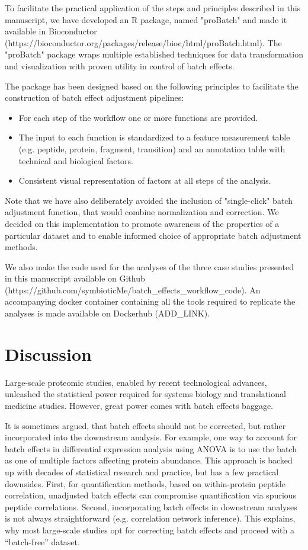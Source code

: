 \documentclass[num-refs]{wiley-article}
\begin{document}
To facilitate the practical application of the steps and principles described in this manuscript, we have developed an R package, named "proBatch" and made it available in Bioconductor (https://bioconductor.org/packages/release/bioc/html/proBatch.html). The "proBatch" package wraps multiple established techniques for data transformation and visualization with proven utility in control of batch effects. 

The package has been designed based on the following principles to facilitate the construction of batch effect adjustment pipelines:

\begin{itemize}
    \item For each step of the workflow one or more functions are provided.
    \item The input to each function is standardized to a feature measurement table (e.g. peptide, protein, fragment, transition) and an annotation table with technical and biological factors.
    \item Consistent visual representation of factors at all steps of the analysis.
\end{itemize}

Note that we have also deliberately avoided the inclusion of "single-click" batch adjustment function, that would combine normalization and correction. We decided on this implementation to promote awareness of the properties of a particular dataset and to enable informed choice of appropriate batch adjustment methods.

We also make the code used for the analyses of the three case studies presented in this manuscript available on Github (https://github.com/symbioticMe/batch_effects_workflow_code). An accompanying docker container containing all the tools required to replicate the analyses is made available on Dockerhub (ADD_LINK).

\section{Discussion}

Large-scale proteomic studies, enabled by recent technological advances, unleashed the statistical power required for systems biology and translational medicine studies. However, great power comes with batch effects baggage. 

It is sometimes argued, that batch effects should not be corrected, but rather incorporated into the downstream analysis. For example, one way to account for batch effects in differential expression analysis using ANOVA is to use the batch as one of multiple factors affecting protein abundance. This approach is backed up with decades of statistical research and practice, but has a few practical downsides. First, for quantification methods, based on within-protein peptide correlation, unadjusted batch effects can compromise quantification via spurious peptide correlations. Second, incorporating batch effects in downstream analyses is not always straightforward (e.g. correlation network inference). This explains, why most large-scale studies opt for correcting batch effects and proceed with a “batch-free” dataset.
\end{document}
